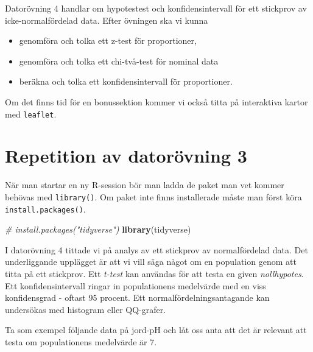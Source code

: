 \documentclass[
]{book}
\newenvironment{Shaded}{\begin{snugshade}}{\end{snugshade}}
\newcommand{\CommentTok}[1]{\textcolor[rgb]{0.56,0.35,0.01}{\textit{#1}}}
\newcommand{\FunctionTok}[1]{\textcolor[rgb]{0.13,0.29,0.53}{\textbf{#1}}}
\newcommand{\NormalTok}[1]{#1}
\theoremstyle{definition}
\theoremstyle{definition}
\theoremstyle{definition}
\theoremstyle{definition}
\theoremstyle{remark}
\begin{document}
Datorövning 4 handlar om hypotestest och konfidensintervall för ett stickprov av icke-normalfördelad data. Efter övningen ska vi kunna

\begin{itemize}
\item
  genomföra och tolka ett z-test för proportioner,
\item
  genomföra och tolka ett chi-två-test för nominal data
\item
  beräkna och tolka ett konfidensintervall för proportioner.
\end{itemize}

Om det finns tid för en bonussektion kommer vi också titta på interaktiva kartor med \texttt{leaflet}.

\section{Repetition av datorövning 3}\label{repetition-av-datoruxf6vning-3}

När man startar en ny R-session bör man ladda de paket man vet kommer behövas med \texttt{library()}. Om paket inte finns installerade måste man först köra \texttt{install.packages()}.

\begin{Shaded}
\begin{Highlighting}[]
\CommentTok{\# install.packages("tidyverse")}
\FunctionTok{library}\NormalTok{(tidyverse)}
\end{Highlighting}
\end{Shaded}

I datorövning 4 tittade vi på analys av ett stickprov av normalfördelad data. Det underliggande upplägget är att vi vill säga något om en population genom att titta på ett stickprov. Ett \emph{t-test} kan användas för att testa en given \emph{nollhypotes}. Ett konfidensintervall ringar in populationens medelvärde med en viss konfidensgrad - oftast 95 procent. Ett normalfördelningsantagande kan undersökas med histogram eller QQ-grafer.

Ta som exempel följande data på jord-pH och låt oss anta att det är relevant att testa om populationens medelvärde är 7.
\end{document}
